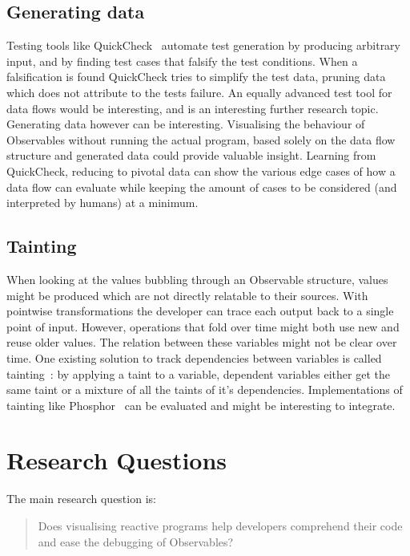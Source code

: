 \subsection{Generating data}%
\label{sec:gen-data} Testing tools like QuickCheck~\cite{quickcheck}
automate test generation by producing arbitrary input, and by finding
test cases that falsify the test conditions.  When a falsification is
found QuickCheck tries to simplify the test data, pruning data which
does not attribute to the tests failure.  An equally advanced test tool
for data flows would be interesting, and is an interesting further
research topic.  Generating data however can be interesting.
Visualising the behaviour of Observables without running the actual
program, based solely on the data flow structure and generated data
could provide valuable insight.  Learning from QuickCheck, reducing to
pivotal data can show the various edge cases of how a data flow can
evaluate while keeping the amount of cases to be considered (and
interpreted by humans) at a minimum.

\subsection{Tainting} When looking at the values bubbling through an
Observable structure, values might be produced which are not directly
relatable to their sources.  With pointwise transformations the
developer can trace each output back to a single point of input.
However, operations that fold over time might both use new and reuse
older values.  The relation between these variables might not be clear
over time.  One existing solution to track dependencies between
variables is called tainting~\cite{bell2015dynamic}:  by applying a
taint to a variable, dependent variables either get the same taint or a
mixture of all the taints of it's dependencies.  Implementations of
tainting like Phosphor~\cite{bell2014phosphor} can be evaluated and
might be interesting to integrate.

\section{Research Questions}%
\label{sec:questions} The main research question is:

\begin{quotation}
    \noindent
    Does visualising reactive programs help developers comprehend their
    code and ease the debugging of Observables?
\end{quotation}

